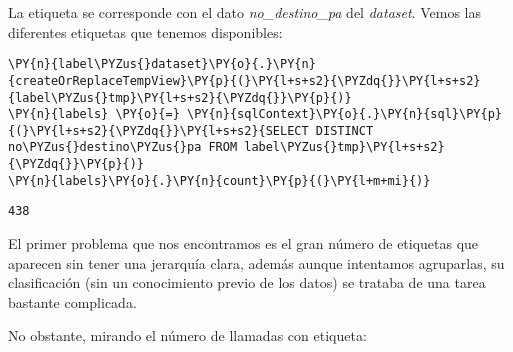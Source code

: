 La etiqueta se corresponde con el dato \textit{no\_destino\_pa} del \textit{dataset}. Vemos las diferentes etiquetas que tenemos disponibles: 
\vspace{0.5cm}
 \begin{tcolorbox}[breakable, size=fbox, boxrule=1pt, pad at break*=1mm,colback=cellbackground, colframe=cellborder]
\begin{Verbatim}[commandchars=\\\{\}]
\PY{n}{label\PYZus{}dataset}\PY{o}{.}\PY{n}{createOrReplaceTempView}\PY{p}{(}\PY{l+s+s2}{\PYZdq{}}\PY{l+s+s2}{label\PYZus{}tmp}\PY{l+s+s2}{\PYZdq{}}\PY{p}{)}
\PY{n}{labels} \PY{o}{=} \PY{n}{sqlContext}\PY{o}{.}\PY{n}{sql}\PY{p}{(}\PY{l+s+s2}{\PYZdq{}}\PY{l+s+s2}{SELECT DISTINCT no\PYZus{}destino\PYZus{}pa FROM label\PYZus{}tmp}\PY{l+s+s2}{\PYZdq{}}\PY{p}{)}
\PY{n}{labels}\PY{o}{.}\PY{n}{count}\PY{p}{(}\PY{l+m+mi}{)}
\end{Verbatim}
\end{tcolorbox}
 
   \begin{tcolorbox}[breakable, size=fbox, boxrule=.5pt, pad at break*=1mm, opacityfill=0]
  \begin{Verbatim}[commandchars=\\\{\}]
  438
  \end{Verbatim}
  \end{tcolorbox}
 
El primer problema que nos encontramos es el gran número de etiquetas que aparecen sin tener una jerarquía clara, además aunque intentamos agruparlas, su clasificación (sin un conocimiento previo de los datos) se trataba de una tarea bastante complicada. 

No obstante, mirando el número de llamadas con etiqueta: 


